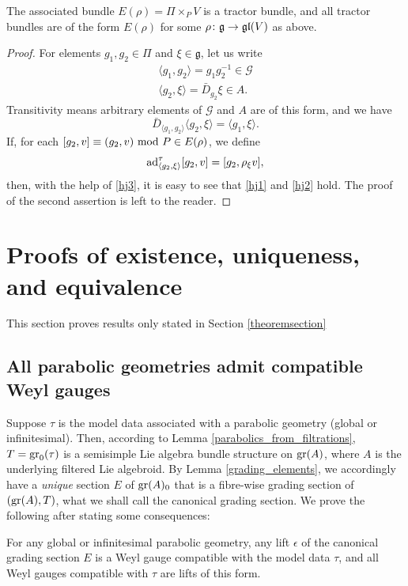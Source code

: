 \documentclass[leqno,12pt]{amsart} %
\newcommand\refreshpage{\newpage}
\newcommand\refreshpage{}
\begin{document}
\begin{proposition}
  The associated bundle $E(\rho) = \Pi \times_P V$ is a tractor bundle, and all tractor
  bundles are of the form $E(\rho)$ for some
  $\rho \colon {\mathfrak g} \rightarrow \mathfrak{gl}(V)$ as above.
\end{proposition}

\begin{proof}
For elements $g_1, g_2 \in \Pi $ and $\xi \in {\mathfrak g} $, let us write
\begin{gather*}
  \langle g_1, g_2 \rangle  = g_1g_2^{-1} \in {\mathcal G}\\
  \langle g_2, \xi \rangle  = \bar D_{g_2} \xi \in A.
\end{gather*}
Transitivity means arbitrary elements of ${\mathcal G} $ and $A$ are of this form, and we have
\begin{equation}
  \bar D_{\langle g_1, g_2 \rangle } \langle g_2, \xi \rangle  = \langle g_1, \xi \rangle .\label{hj3}
\end{equation}
If, for each $[g_2, v] \equiv (g_2, v) ~\mathrm{mod}~ P \in E(\rho)$, we define
\begin{equation*}
  \operatorname{ad}^\tau_{\langle g_2, \xi \rangle} [g_2, v]= [g_2, \rho_\xi v],
\end{equation*}
then, with the help of \eqref{hj3}, it is easy to see that \eqref{hj1} and \eqref{hj2}
hold.  The proof of the second assertion is left to the reader.
\end{proof}

\refreshpage
\section{Proofs of existence, uniqueness, and equivalence}\label{parabolic_proofs}
This section proves results only stated in Section \ref{theoremsection}

\subsection{All parabolic geometries admit compatible Weyl gauges}\label{all}
Suppose $\tau $ is the model data associated with a parabolic geometry (global or
infinitesimal). Then, according to Lemma \ref{parabolics_from_filtrations},
$T = \operatorname{\operatorname{gr}}_0(\tau)$ is a semisimple Lie algebra bundle structure on $\operatorname{\operatorname{gr}}(A)$, where
$A$ is the underlying filtered Lie algebroid. By Lemma \ref{grading_elements}, we
accordingly have a {\em unique} section $E$ of $\operatorname{\operatorname{gr}}(A)_0$ that is a fibre-wise grading
section of $(\operatorname{\operatorname{gr}}(A), T)$, what we shall call the {\df canonical grading section}. We
prove the following after stating some consequences:
\begin{proposition}
  For any global or infinitesimal parabolic geometry, any lift $\epsilon$ of the canonical
  grading section $E$ is a Weyl gauge compatible with the model data $\tau $, and all Weyl
  gauges compatible with $\tau$ are lifts of this form.
\end{proposition}
\end{document}
